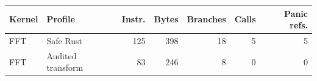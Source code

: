 \begin{tabular}{@{}llrrrrr@{}}
\toprule
Kernel & Profile & Instr. & Bytes & Branches & Calls & Panic refs. \\
\midrule
FFT & Safe Rust & 125 & 398 & 18 & 5 & 5 \\
FFT & Audited transform & 83 & 246 & 8 & 0 & 0 \\
\bottomrule
\end{tabular}
